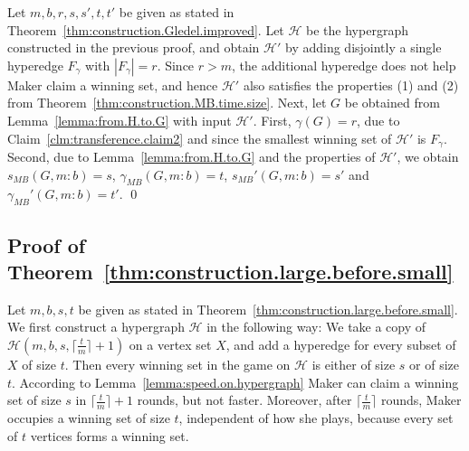 \documentclass[reqno, 12pt]{amsart}
\numberwithin{equation}{section}
\numberwithin{figure}{section}
\begin{document}
Let $m,b,r,s,s',t,t'$ be given as stated in Theorem~\ref{thm:construction.Gledel.improved}. 
Let
$\mathcal{H}$ be the hypergraph constructed in the previous proof, and obtain $\mathcal{H}'$ by adding disjointly a single hyperedge $F_\gamma$ with $|F_\gamma| = r$. 
Since $r>m$, the additional hyperedge does not help Maker
claim a winning set, and hence $\mathcal{H}'$ also satisfies the properties (1)
and (2) from Theorem~\ref{thm:construction.MB.time.size}.
Next, let $G$ be obtained from Lemma~\ref{lemma:from.H.to.G}
with input $\mathcal{H}'$. 
First, $\gamma(G) = r$, due to Claim~\ref{clm:transference.claim2}
and since the smallest winning set of $\mathcal{H}'$ is $F_\gamma$.
Second, due to Lemma~\ref{lemma:from.H.to.G} and the properties of $\mathcal{H}'$, we obtain
 $s_{MB}(G,m:b) = s$,
 $\gamma_{MB}(G,m:b) = t$, 
 $s_{MB}'(G,m:b) = s'$ and $\gamma_{MB}'(G,m:b) = t'$. \qed





\subsection{Proof of Theorem~\ref{thm:construction.large.before.small}}
Let $m,b,s,t$ be given as stated in Theorem~\ref{thm:construction.large.before.small}. We first construct a hypergraph $\mathcal{H}$ in the following way: We take a copy of $\mathcal{H}(m,b,s,\lceil \frac{t}{m} \rceil + 1)$ on a vertex set $X$, and add a hyperedge for every subset of $X$ of size $t$. Then every winning set in the game on $\mathcal{H}$
is either of size $s$ or of size $t$. According to Lemma~\ref{lemma:speed.on.hypergraph} Maker can claim a winning set of size $s$ in $\lceil \frac{t}{m} \rceil + 1$ rounds, but not faster.
Moreover, after $\lceil \frac{t}{m} \rceil$ rounds, Maker occupies a winning set of size $t$, independent of how she plays, because every set of $t$ vertices forms a winning set.
\end{document}
